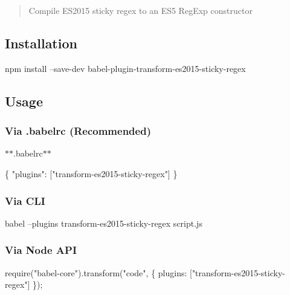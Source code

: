 \begin{quote}
Compile E\+S2015 sticky regex to an E\+S5 Reg\+Exp constructor \end{quote}


\subsection*{Installation}


\begin{DoxyCode}
npm install --save-dev babel-plugin-transform-es2015-sticky-regex
\end{DoxyCode}


\subsection*{Usage}

\subsubsection*{Via {\ttfamily .babelrc} (Recommended)}

$\ast$$\ast$.babelrc$\ast$$\ast$


\begin{DoxyCode}
\{
  "plugins": ["transform-es2015-sticky-regex"]
\}
\end{DoxyCode}


\subsubsection*{Via C\+LI}


\begin{DoxyCode}
babel --plugins transform-es2015-sticky-regex script.js
\end{DoxyCode}


\subsubsection*{Via Node A\+PI}


\begin{DoxyCode}
require("babel-core").transform("code", \{
  plugins: ["transform-es2015-sticky-regex"]
\});
\end{DoxyCode}
 